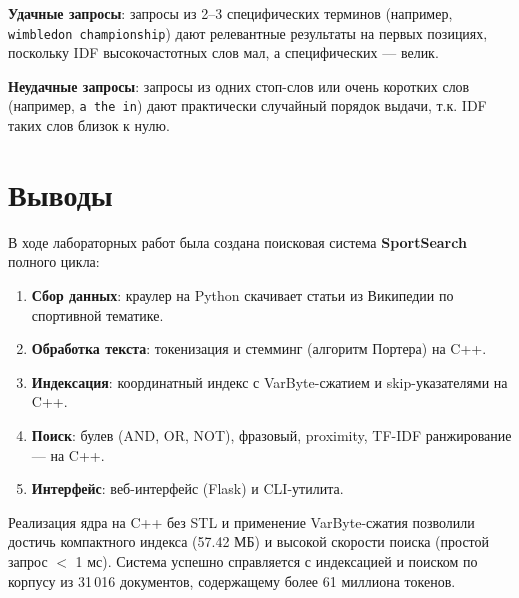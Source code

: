 \documentclass[a4paper,12pt]{article}
\begin{document}
\textbf{Удачные запросы}: запросы из 2--3 специфических терминов (например, \texttt{wimbledon championship}) дают релевантные результаты на первых позициях, поскольку IDF высокочастотных слов мал, а специфических — велик.

\textbf{Неудачные запросы}: запросы из одних стоп-слов или очень коротких слов (например, \texttt{a the in}) дают практически случайный порядок выдачи, т.к. IDF таких слов близок к нулю.


\section{Выводы}
В ходе лабораторных работ была создана поисковая система \textbf{SportSearch} полного цикла:
\begin{enumerate}
    \item \textbf{Сбор данных}: краулер на Python скачивает статьи из Википедии по спортивной тематике.
    \item \textbf{Обработка текста}: токенизация и стемминг (алгоритм Портера) на C++.
    \item \textbf{Индексация}: координатный индекс с VarByte-сжатием и skip-указателями на C++.
    \item \textbf{Поиск}: булев (AND, OR, NOT), фразовый, proximity, TF-IDF ранжирование — на C++.
    \item \textbf{Интерфейс}: веб-интерфейс (Flask) и CLI-утилита.
\end{enumerate}

Реализация ядра на C++ без STL и применение VarByte-сжатия позволили достичь компактного индекса (57.42 МБ) и высокой скорости поиска (простой запрос $<$ 1 мс). Система успешно справляется с индексацией и поиском по корпусу из 31\,016 документов, содержащему более 61 миллиона токенов.
\end{document}
